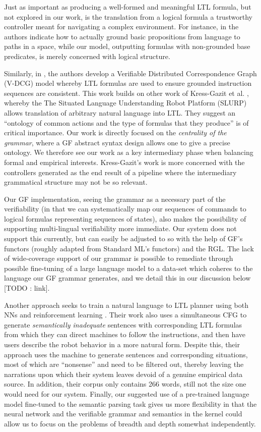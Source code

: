 \documentclass[a4paper, 11pt]{article}
\begin{document}
Just as important as producing a well-formed and meaningful LTL formula, but not
explored in our work, is the translation from a logical formula a trustworthy
controller meant for navigating a complex environment. For instance, in
\cite{plaku2016motion} the authors indicate how to actually ground basic
propositions from language to paths in a space, while our model, outputting
formulas with non-grounded base predicates, is merely concerned with logical
structure.

Similarly, in \cite{7759412}, the authors develop a Verifiable Distributed
Correspondence Graph (V-DCG) model whereby LTL formulas are used to ensure
grounded instruction sequences are consistent. This work builds on other work of
Kress-Gazit et al. \cite{provCorrectNatControl}, whereby the The Situated
Language Understanding Robot Platform (SLURP) allows translation of arbitrary
natural language into LTL. They suggest an ``ontology of common actions and the
type of formulas that they produce'' is of critical importance. Our work is
directly focused on the \emph{centrality of the grammar}, where a GF abstract
syntax design allows one to give a precise ontology. We therefore see our work as
a key intermediary phase when balancing formal and empirical interests.
Kress-Gazit's work is more concerned with the controllers generated as the end
result of a pipeline where the intermediary grammatical structure may not be so
relevant.

Our GF implementation, seeing the grammar as a necessary part of the
verifiability (in that we can systematically map our sequences of commands to
logical formulas representing sequences of states), also makes the possibility of
supporting multi-lingual verifiability more immediate. Our system does not
support this currently, but can easily be adjusted to so with the help of GF's
functors (roughly adapted from Standard ML's functors) and the RGL. The lack of wide-coverage
support of our grammar is possible to remediate through possible fine-tuning of
a large language model to a data-set which coheres to the language our GF
grammar generates, and we detail this in our discussion below [TODO : link].

Another approach seeks to train a natural language to LTL planner using both NNs
and reinforcement learning \cite{ltlSemParse}. Their work also uses a
simultaneous CFG to generate \emph{semantically inadequate} sentences with
corresponding LTL formulas from which they can direct machines to follow the
instructions, and then have users describe the robot behavior in a more natural
form. Despite this, their approach uses the machine to generate sentences and
corresponding situations, most of which are ``nonsense'' and need to be filtered
out, thereby leaving the narrations upon which their system leaves devoid of a
genuine empirical data source. In addition, their corpus only contains 266
words, still not the size one would need for our system. Finally, our suggested
use of a pre-trained language model fine-tuned to the semantic parsing task
gives us more flexibility in that the neural network and the verifiable grammar
and semantics in the kernel could allow us to focus on the problems of breadth
and depth somewhat independently.
\end{document}
